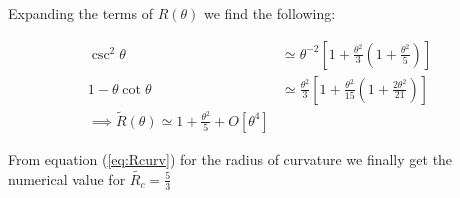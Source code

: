 Expanding the terms of $R(\theta)$ we find the following:

\begin{align}
  \csc^2\theta &\simeq \theta^{-2}\left[1+\frac{\theta^2}{3}\left(1+\frac{\theta^2}{5}\right)\right] \\
  1-\theta\cot\theta &\simeq \frac{\theta^2}{3}\left[1 + \frac{\theta^2}{15}\left(1+\frac{2\theta^2}{21}\right)\right] \\
  \implies \tilde{R}(\theta) \simeq 1 + \frac{\theta^2}{5} + O\left[\theta^4\right]
\end{align}

From equation (\ref{eq:Rcurv}) for the radius of curvature we finally get the numerical value for $\tilde{R_c} = \frac{5}{3}$
\clearpage
{}
